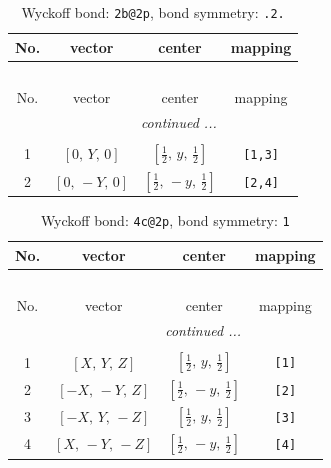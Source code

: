 \documentclass[fleqn,8pt]{jsarticle}
\begin{document}
\renewcommand{\arraystretch}{1.2}
\begin{longtable}{cccc}
\caption{Wyckoff bond: {\tt 2b@2p}, bond symmetry: {\tt .2.}}
 \\
 \hline \hline
No. & vector & center & mapping \\ \hline \endfirsthead

\multicolumn{3}{l}{\tablename\ \thetable{}} \\
 \hline \hline
No. & vector & center & mapping \\ \hline \endhead

 \hline \hline
\multicolumn{3}{r}{\footnotesize\it continued ...} \\ \endfoot

 \hline \hline
\multicolumn{3}{r}{} \\ \endlastfoot

1 & $\left[ 0,\, Y,\, 0 \right]$ & $\left[ \frac{1}{2},\, y,\, \frac{1}{2} \right]$ & {\tt [1,3]} \\ \hline
2 & $\left[ 0,\, - Y,\, 0 \right]$ & $\left[ \frac{1}{2},\, - y,\, \frac{1}{2} \right]$ & {\tt [2,4]} \\
\end{longtable}
\renewcommand{\arraystretch}{1.2}
\begin{longtable}{cccc}
\caption{Wyckoff bond: {\tt 4c@2p}, bond symmetry: {\tt 1}}
 \\
 \hline \hline
No. & vector & center & mapping \\ \hline \endfirsthead

\multicolumn{3}{l}{\tablename\ \thetable{}} \\
 \hline \hline
No. & vector & center & mapping \\ \hline \endhead

 \hline \hline
\multicolumn{3}{r}{\footnotesize\it continued ...} \\ \endfoot

 \hline \hline
\multicolumn{3}{r}{} \\ \endlastfoot

1 & $\left[ X,\, Y,\, Z \right]$ & $\left[ \frac{1}{2},\, y,\, \frac{1}{2} \right]$ & {\tt [1]} \\ \hline
2 & $\left[ - X,\, - Y,\, Z \right]$ & $\left[ \frac{1}{2},\, - y,\, \frac{1}{2} \right]$ & {\tt [2]} \\ \hline
3 & $\left[ - X,\, Y,\, - Z \right]$ & $\left[ \frac{1}{2},\, y,\, \frac{1}{2} \right]$ & {\tt [3]} \\ \hline
4 & $\left[ X,\, - Y,\, - Z \right]$ & $\left[ \frac{1}{2},\, - y,\, \frac{1}{2} \right]$ & {\tt [4]} \\
\end{longtable}
\end{document}
